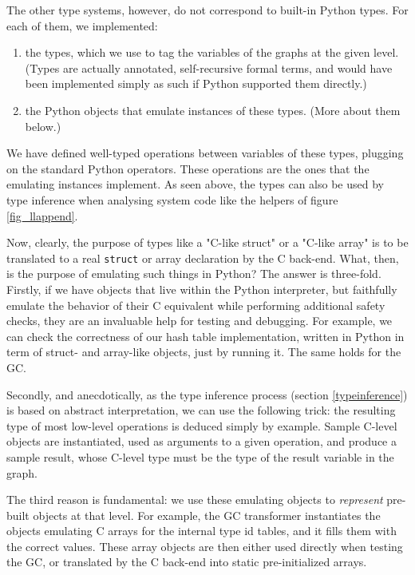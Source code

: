 \documentclass{acm_proc_article-sp}
\begin{document}
The other type systems, however, do not correspond to built-in Python
types.  For each of them, we implemented:
%
\begin{enumerate}
\item the types, which we use to tag the variables of the graphs at
      the given level.  (Types are actually annotated, self-recursive
      formal terms, and would have been implemented simply as such if
      Python supported them directly.)

\item the Python objects that emulate instances of these types.  (More
      about them below.)
\end{enumerate}
%
We have defined well-typed operations between variables of these types,
plugging on the standard Python operators.  These operations are the
ones that the emulating instances implement.  As seen above, the types
can also be used by type inference when analysing system code like the
helpers of figure \ref{fig_llappend}.

Now, clearly, the purpose of types like a "C-like struct" or a "C-like
array" is to be translated to a real \texttt{struct} or array declaration by
the C back-end.  What, then, is the purpose of emulating such things in
Python?  The answer is three-fold.  Firstly, if we have objects that
live within the Python interpreter, but faithfully emulate the behavior
of their C equivalent while performing additional safety checks, they
are an invaluable help for testing and debugging.  For example, we can
check the correctness of our hash table implementation, written in
Python in term of struct- and array-like objects, just by running it.
The same holds for the GC.

Secondly, and anecdotically, as the type inference process (section
\ref{typeinference}) is based on abstract interpretation, we can use
the following trick: the resulting type of most low-level operations
is deduced simply by example.  Sample C-level objects are
instantiated, used as arguments to a given operation, and produce a
sample result, whose C-level type must be the type of the result
variable in the graph.

The third reason is fundamental: we use these emulating objects to
\textit{represent} pre-built objects at that level.  For example, the GC
transformer instantiates the objects emulating C arrays for the internal
type id tables, and it fills them with the correct values.  These array
objects are then either used directly when testing the GC, or translated
by the C back-end into static pre-initialized arrays.
\end{document}
